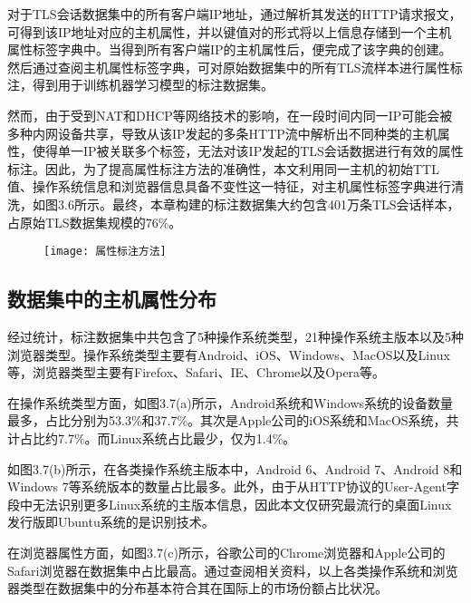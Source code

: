 \vbox{}

对于TLS会话数据集中的所有客户端IP地址，通过解析其发送的HTTP请求报文，可得到该IP地址对应的主机属性，并以键值对的形式将以上信息存储到一个主机属性标签字典中。当得到所有客户端IP的主机属性后，便完成了该字典的创建。然后通过查阅主机属性标签字典，可对原始数据集中的所有TLS流样本进行属性标注，得到用于训练机器学习模型的标注数据集。

然而，由于受到NAT和DHCP等网络技术的影响，在一段时间内同一IP可能会被多种内网设备共享，导致从该IP发起的多条HTTP流中解析出不同种类的主机属性，使得单一IP被关联多个标签，无法对该IP发起的TLS会话数据进行有效的属性标注。因此，为了提高属性标注方法的准确性，本文利用同一主机的初始TTL值、操作系统信息和浏览器信息具备不变性这一特征，对主机属性标签字典进行清洗，如图3.6所示。最终，本章构建的标注数据集大约包含401万条TLS会话样本，占原始TLS数据集规模的76\%。

\begin{figure}[!htbp]
    \centering
    \texttt{[image: 属性标注方法]}
\end{figure}

\subsection{数据集中的主机属性分布} 
经过统计，标注数据集中共包含了5种操作系统类型，21种操作系统主版本以及5种浏览器类型。操作系统类型主要有Android、iOS、Windows、MacOS以及Linux等，浏览器类型主要有Firefox、Safari、IE、Chrome以及Opera等。

在操作系统类型方面，如图3.7(a)所示，Android系统和Windows系统的设备数量最多，占比分别为53.3\%和37.7\%。其次是Apple公司的iOS系统和MacOS系统，共计占比约7.7\%。而Linux系统占比最少，仅为1.4\%。

如图3.7(b)所示，在各类操作系统主版本中，Android 6、Android 7、Android 8和Windows 7等系统版本的数量占比最多。此外，由于从HTTP协议的User-Agent字段中无法识别更多Linux系统的主版本信息，因此本文仅研究最流行的桌面Linux发行版即Ubuntu系统的是识别技术。

在浏览器属性方面，如图3.7(c)所示，谷歌公司的Chrome浏览器和Apple公司的Safari浏览器在数据集中占比最高。通过查阅相关资料，以上各类操作系统和浏览器类型在数据集中的分布基本符合其在国际上的市场份额占比状况。

